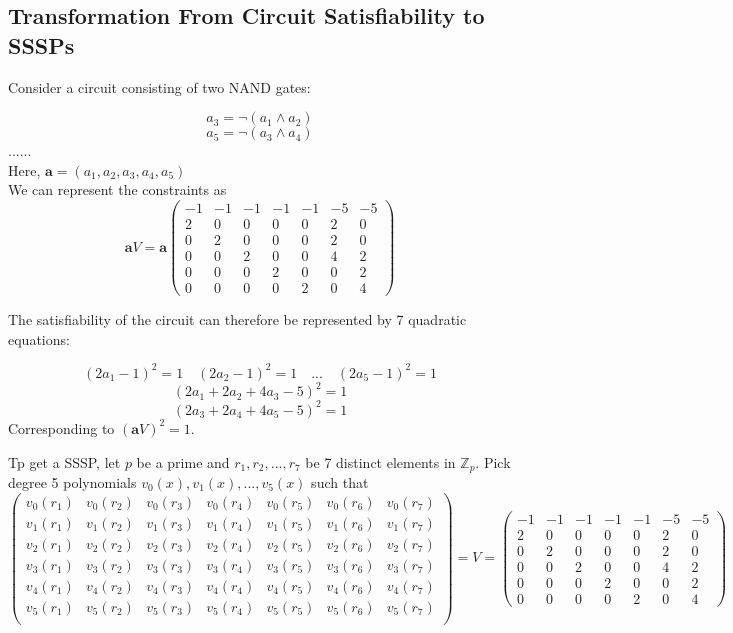\documentclass[lnbip]{svmultln}
\begin{document}
\subsection{Transformation From Circuit Satisfiability to SSSPs}
Consider a circuit consisting of two NAND gates:

 $$a_3 = \neg (a_1\wedge a_2)$$
 $$a_5 = \neg (a_3\wedge a_4)$$
......\\
Here, $\textbf{a}=(a_1,a_2,a_3,a_4,a_5)$\\
We can represent the constraints as 
$$\textbf{a}V=\textbf{a}
\begin{pmatrix} 
-1 & -1 & -1 & -1 & -1 & -5 & -5 \\
2 & 0 & 0 & 0 & 0 & 2 & 0 \\
0 & 2 & 0 & 0 & 0 & 2 & 0 \\
0 & 0 & 2 & 0 & 0 & 4 & 2 \\
0 & 0 & 0 & 2 & 0 & 0 & 2 \\
0 & 0 & 0 & 0 & 2 & 0 & 4 
\end{pmatrix}
$$

The satisfiability of the circuit can therefore be represented by 7 quadratic equations:

$$(2a_1-1)^2 =1 \quad (2a_2-1)^2 =1 \quad ... \quad (2a_5-1)^2 =1$$
$$(2a_1+2a_2+4a_3-5)^2=1$$
$$(2a_3+2a_4+4a_5-5)^2=1$$
Corresponding to $(\textbf{a} V)^2=1$.

Tp get a SSSP, let $p$ be a prime and $r_1,r_2,...,r_7$ be 7 distinct elements in $\mathbb{Z}_p$. Pick degree 5 polynomials $v_0(x),v_1(x),...,v_5(x)$ such that
$$
\begin{pmatrix} 
v_0(r_1) & v_0(r_2) & v_0(r_3) & v_0(r_4) & v_0(r_5) & v_0(r_6) & v_0(r_7) \\
v_1(r_1) & v_1(r_2) & v_1(r_3) & v_1(r_4) & v_1(r_5) & v_1(r_6) & v_1(r_7) \\
v_2(r_1) & v_2(r_2) & v_2(r_3) & v_2(r_4) & v_2(r_5) & v_2(r_6) & v_2(r_7) \\
v_3(r_1) & v_3(r_2) & v_3(r_3) & v_3(r_4) & v_3(r_5) & v_3(r_6) & v_3(r_7) \\
v_4(r_1) & v_4(r_2) & v_4(r_3) & v_4(r_4) & v_4(r_5) & v_4(r_6) & v_4(r_7) \\
v_5(r_1) & v_5(r_2) & v_5(r_3) & v_5(r_4) & v_5(r_5) & v_5(r_6) & v_5(r_7) \\
\end{pmatrix}
= V =
\begin{pmatrix} 
-1 & -1 & -1 & -1 & -1 & -5 & -5 \\
2 & 0 & 0 & 0 & 0 & 2 & 0 \\
0 & 2 & 0 & 0 & 0 & 2 & 0 \\
0 & 0 & 2 & 0 & 0 & 4 & 2 \\
0 & 0 & 0 & 2 & 0 & 0 & 2 \\
0 & 0 & 0 & 0 & 2 & 0 & 4 
\end{pmatrix}
$$
\end{document}
